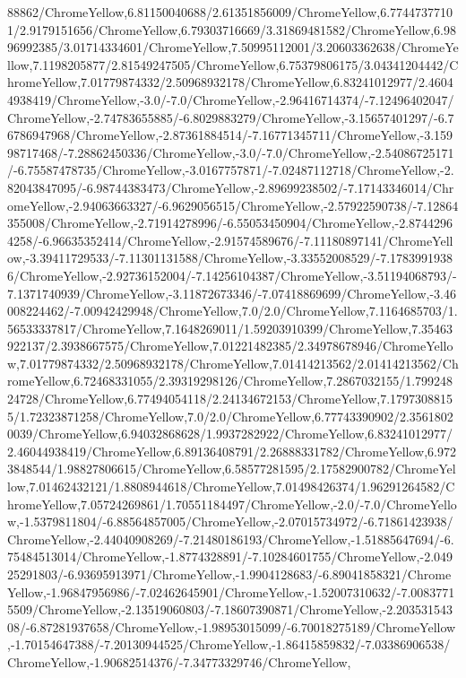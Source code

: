 {\begin{tikzternal}
{88862/ChromeYellow,6.81150040688/2.61351856009/ChromeYellow,6.77447377101/2.9179151656/ChromeYellow,6.79303716669/3.31869481582/ChromeYellow,6.9896992385/3.01714334601/ChromeYellow,7.50995112001/3.20603362638/ChromeYellow,7.1198205877/2.81549247505/ChromeYellow,6.75379806175/3.04341204442/ChromeYellow,7.01779874332/2.50968932178/ChromeYellow,6.83241012977/2.46044938419/ChromeYellow,-3.0/-7.0/ChromeYellow,-2.96416714374/-7.12496402047/ChromeYellow,-2.74783655885/-6.8029883279/ChromeYellow,-3.15657401297/-6.76786947968/ChromeYellow,-2.87361884514/-7.16771345711/ChromeYellow,-3.15998717468/-7.28862450336/ChromeYellow,-3.0/-7.0/ChromeYellow,-2.54086725171/-6.75587478735/ChromeYellow,-3.0167757871/-7.02487112718/ChromeYellow,-2.82043847095/-6.98744383473/ChromeYellow,-2.89699238502/-7.17143346014/ChromeYellow,-2.94063663327/-6.9629056515/ChromeYellow,-2.57922590738/-7.12864355008/ChromeYellow,-2.71914278996/-6.55053450904/ChromeYellow,-2.87442964258/-6.96635352414/ChromeYellow,-2.91574589676/-7.11180897141/ChromeYellow,-3.39411729533/-7.11301131588/ChromeYellow,-3.33552008529/-7.17839919386/ChromeYellow,-2.92736152004/-7.14256104387/ChromeYellow,-3.51194068793/-7.1371740939/ChromeYellow,-3.11872673346/-7.07418869699/ChromeYellow,-3.46008224462/-7.00942429948/ChromeYellow,7.0/2.0/ChromeYellow,7.1164685703/1.56533337817/ChromeYellow,7.1648269011/1.59203910399/ChromeYellow,7.35463922137/2.3938667575/ChromeYellow,7.01221482385/2.34978678946/ChromeYellow,7.01779874332/2.50968932178/ChromeYellow,7.01414213562/2.01414213562/ChromeYellow,6.72468331055/2.39319298126/ChromeYellow,7.2867032155/1.79924824728/ChromeYellow,6.77494054118/2.24134672153/ChromeYellow,7.17973088155/1.72323871258/ChromeYellow,7.0/2.0/ChromeYellow,6.77743390902/2.35618020039/ChromeYellow,6.94032868628/1.9937282922/ChromeYellow,6.83241012977/2.46044938419/ChromeYellow,6.89136408791/2.26888331782/ChromeYellow,6.9723848544/1.98827806615/ChromeYellow,6.58577281595/2.17582900782/ChromeYellow,7.01462432121/1.8808944618/ChromeYellow,7.01498426374/1.96291264582/ChromeYellow,7.05724269861/1.70551184497/ChromeYellow,-2.0/-7.0/ChromeYellow,-1.5379811804/-6.88564857005/ChromeYellow,-2.07015734972/-6.71861423938/ChromeYellow,-2.44040908269/-7.21480186193/ChromeYellow,-1.51885647694/-6.75484513014/ChromeYellow,-1.8774328891/-7.10284601755/ChromeYellow,-2.04925291803/-6.93695913971/ChromeYellow,-1.9904128683/-6.89041858321/ChromeYellow,-1.96847956986/-7.02462645901/ChromeYellow,-1.52007310632/-7.00837715509/ChromeYellow,-2.13519060803/-7.18607390871/ChromeYellow,-2.20353154308/-6.87281937658/ChromeYellow,-1.98953015099/-6.70018275189/ChromeYellow,-1.70154647388/-7.20130944525/ChromeYellow,-1.86415859832/-7.03386906538/ChromeYellow,-1.90682514376/-7.34773329746/ChromeYellow,
}
\end{tikzternal}}
